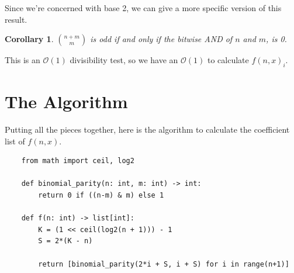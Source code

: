 \documentclass{article}
\newtheorem{corollary}{Corollary}
\renewcommand{\O}{\mathcal{O}}
\begin{document}
	Since we're concerned with base 2, we can give a more specific version of this result.
	\begin{corollary}
		$\binom{n+m}{m}$ is odd if and only if the bitwise AND of $n$ and $m$, is 0.
	\end{corollary}
	This is an $\O(1)$ divisibility test, so we have an $\O(1)$ to calculate $f(n,x)_i$.

	\section{The Algorithm}
	Putting all the pieces together, here is the algorithm to calculate the coefficient list of $f(n,x)$.
	
	\begin{center}
	\begin{verbatim}
	from math import ceil, log2
		
	def binomial_parity(n: int, m: int) -> int:
	    return 0 if ((n-m) & m) else 1
		
	def f(n: int) -> list[int]:
	    K = (1 << ceil(log2(n + 1))) - 1
	    S = 2*(K - n)
	    
	    return [binomial_parity(2*i + S, i + S) for i in range(n+1)]
	\end{verbatim}
	\end{center}
\end{document}
